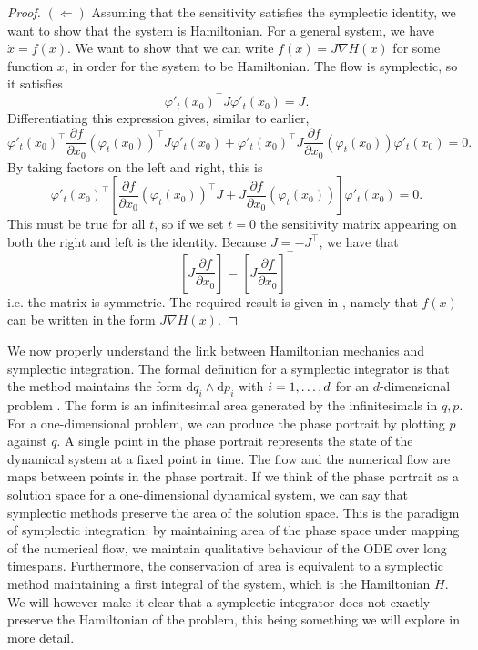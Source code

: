 \begin{proof}
$(\Leftarrow)$ Assuming that the sensitivity satisfies the symplectic identity, we want to show that the system is Hamiltonian.
For a general system, we have $\dot{x} = f(x)$. We want to show that we can write $f(x) = J \nabla H(x)$ for some function $x$, in order for the system to be Hamiltonian.
The flow is symplectic, so it satisfies
\begin{equation*}
	\varphi'_t(x_0)^\top J \varphi'_t(x_0) = J. 
\end{equation*}
Differentiating this expression gives, similar to earlier,
\begin{equation*}
	\varphi'_t(x_0)^\top \frac{\partial f}{\partial x_0}(\varphi_t(x_0))^\top J \varphi'_t(x_0) + \varphi'_t(x_0)^\top J \frac{\partial f}{\partial x_0}(\varphi_t(x_0)) \varphi'_t(x_0) = 0.
\end{equation*}
By taking factors on the left and right, this is
\begin{equation*}
	\varphi'_t(x_0)^\top \left[ \frac{\partial f}{\partial x_0}(\varphi_t(x_0))^\top J + J \frac{\partial f}{\partial x_0}(\varphi_t(x_0)) \right] \varphi'_t(x_0) = 0.
\end{equation*}
This must be true for all $t$, so if we set $t=0$ the sensitivity matrix appearing on both the right and left is the identity.
Because $J = -J^\top$, we have that
\begin{equation*}
	\left[ J \frac{\partial f}{\partial x_0} \right]= \left[ J \frac{\partial f}{\partial x_0} \right]^\top
\end{equation*}
i.e. the matrix is symmetric. 
The required result is given in \cite{gni2006}, namely that $f(x)$ can be written in the form $J \nabla H(x)$.
\end{proof}

We now properly understand the link between Hamiltonian mechanics and symplectic integration.
The formal definition for a symplectic integrator is that the method maintains the form $\mathrm{d}q_i \wedge \mathrm{d}p_i$ with $i = 1, \mathellipsis, d$ for an $d$-dimensional problem \cite{gni2006}.
The form is an infinitesimal area generated by the infinitesimals in $q, p$.
For a one-dimensional problem, we can produce the phase portrait by plotting $p$ against $q$.
A single point in the phase portrait represents the state of the dynamical system at a fixed point in time.
The flow and the numerical flow are maps between points in the phase portrait.
If we think of the phase portrait as a solution space for a one-dimensional dynamical system, we can say that symplectic methods preserve the area of the solution space.
This is the paradigm of symplectic integration: by maintaining area of the phase space under mapping of the numerical flow, we maintain qualitative behaviour of the ODE over long timespans.
Furthermore, the conservation of area is equivalent to a symplectic method maintaining a first integral of the system, which is the Hamiltonian $H$.
We will however make it clear that a symplectic integrator does not exactly preserve the Hamiltonian of the problem, this being something we will explore in more detail.

